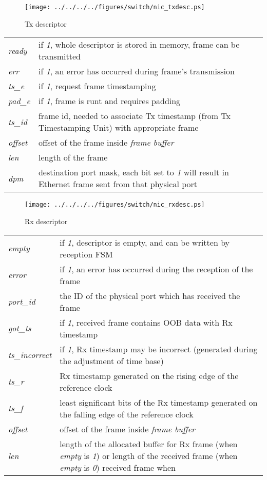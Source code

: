 \begin{figure}[ht]
  \begin{center}
    \texttt{[image: ../../../../figures/switch/nic\_txdesc.ps]}
    \caption{Tx descriptor}
    \label{fig:nic:tx_desc}
  \end{center}
\end{figure}
\newpage
\begin{tabular}{l p{12cm}}
  \emph{ready} & if \emph{1}, whole descriptor is stored in memory, frame can be
  transmitted\\
  \emph{err} & if \emph{1}, an error has occurred during frame's
    transmission\\
  \emph{ts\_e} & if \emph{1}, request frame timestamping\\
  \emph{pad\_e} & if \emph{1}, frame is runt and requires padding\\
  \emph{ts\_id} & frame id, needed to associate Tx timestamp (from Tx
    Timestamping Unit) with appropriate frame\\
  \emph{offset} & offset of the frame inside \emph{frame buffer}\\
  \emph{len} & length of the frame\\
  \emph{dpm} & destination port mask, each bit set to \emph{1} will
    result in Ethernet frame sent from that physical port\\
\end{tabular}


\begin{figure}[ht]
  \begin{center}
    \texttt{[image: ../../../../figures/switch/nic\_rxdesc.ps]}
    \caption{Rx descriptor}
    \label{fig:nic:rx_desc}
  \end{center}
\end{figure}
\begin{tabular}{l p{12cm}}
  \emph{empty} & if \emph{1}, descriptor is empty, and can be written by
  reception FSM\\
  \emph{error} & if \emph{1}, an error has occurred during the reception of the
  frame\\
  \emph{port\_id} & the ID of the physical port which has received the frame\\
  \emph{got\_ts} & if \emph{1}, received frame contains OOB data with Rx
  timestamp\\
  \emph{ts\_incorrect} & if \emph{1}, Rx timestamp may be incorrect (generated
  during the adjustment of time base)\\
  \emph{ts\_r} & Rx timestamp generated on the rising edge of the reference
  clock\\
  \emph{ts\_f} & least significant bits of the Rx timestamp generated on the
  falling edge of the reference clock\\
  \emph{offset} & offset of the frame inside \emph{frame buffer}\\
  \emph{len} & length of the allocated buffer for Rx frame (when \emph{empty}
  is \emph{1}) or length of the received frame (when \emph{empty} is \emph{0})
  received frame when
\end{tabular}

